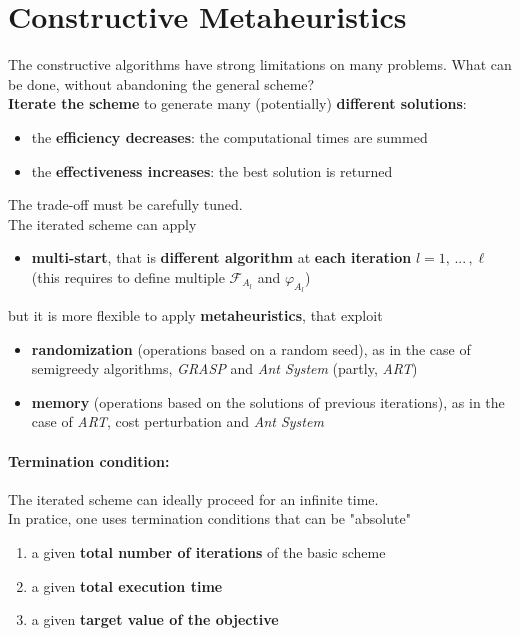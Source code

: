 \section{Constructive Metaheuristics}

The constructive algorithms have strong limitations on many problems. What can be done, without abandoning the general scheme? \\

\textbf{Iterate the scheme} to generate many (potentially) \textbf{different solutions}:
\begin{itemize}
	\item the \textbf{efficiency decreases}: the computational times are summed
	\item the \textbf{effectiveness increases}: the best solution is returned
\end{itemize}

The trade-off must be carefully tuned.\\

The iterated scheme can apply
\begin{itemize}
	\item \textbf{multi-start}, that is \textbf{different algorithm} at \textbf{each iteration} $l = 1,\, ... \, , \ell$ (this requires to define multiple $\mathcal{F}_{A_l}$ and $\varphi_{A_l}$)
\end{itemize}

but it is more flexible to apply \textbf{metaheuristics}, that exploit
\begin{itemize}
	\item \textbf{randomization} (operations based on a random seed), as in the case of semigreedy algorithms, \textit{GRASP} and \textit{Ant System} (partly, \textit{ART})
	
	\item \textbf{memory} (operations based on the solutions of previous iterations), as in the case of \textit{ART}, cost perturbation and \textit{Ant System}
\end{itemize}

\paragraph{Termination condition:} The iterated scheme can ideally proceed for an infinite time.\\
In pratice, one uses termination conditions that can be "absolute"

\begin{enumerate}
	\item a given \textbf{total number of iterations} of the basic scheme
	
	\item a given \textbf{total execution time}
	
	\item a given \textbf{target value of the objective}
\end{enumerate}

